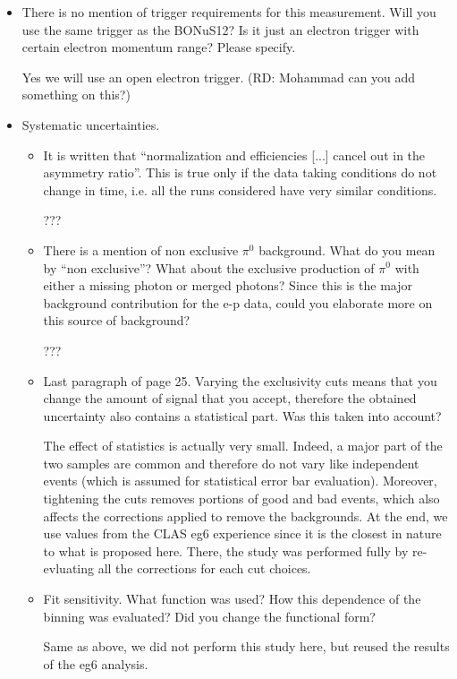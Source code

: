 \begin{itemize}
  \item There is no mention of trigger requirements for this measurement. Will you use the same trigger as the BONuS12? Is it just an electron trigger with certain electron momentum range? Please specify.
  
{\color{red} Yes we will use an open electron trigger. (RD: Mohammad can you add something on this?)}

  \item Systematic uncertainties. 
  \begin{itemize}
   \item  It is written that ``normalization and efficiencies [...] cancel out in the asymmetry ratio''. This is true only if the data taking conditions do not change in time, i.e. all the runs considered have very similar conditions.

{\color{red} ???}

   \item There is a mention of non exclusive $\pi^0$ background. What do you mean by ``non exclusive''? What about the exclusive production of $\pi^0$ with either a missing photon or merged photons? Since this is the major background contribution for the e-p data, could you elaborate more on this source of background?

{\color{red} ???}

   \item Last paragraph of page 25. Varying the exclusivity cuts means that you change the amount of signal that you accept, therefore the obtained uncertainty also contains a statistical part. Was this taken into account?

{\color{red} The effect of statistics is actually very small. Indeed, a major part of the two samples are common and 
therefore do not vary like independent events (which is assumed for statistical error bar evaluation). 
Moreover, tightening the cuts removes portions of good and bad events, which 
also affects the corrections applied to remove the backgrounds. At the end, we use values from the CLAS eg6
experience since it is the closest in nature to what is proposed here. There, the study was performed fully
by re-evluating all the corrections for each cut choices.}

   \item Fit sensitivity. What function was used? How this dependence of the binning was evaluated? Did you change the functional form?

{\color{red} Same as above, we did not perform this study here, but reused the results of the eg6 analysis.}

  \end{itemize}
  
  \end{itemize}
 

